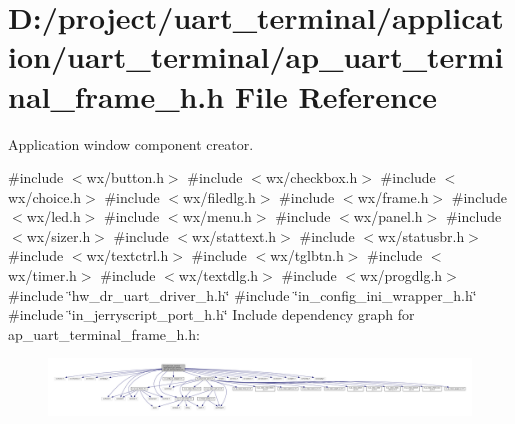 \section{D\+:/project/uart\+\_\+terminal/application/uart\+\_\+terminal/ap\+\_\+uart\+\_\+terminal\+\_\+frame\+\_\+h.h File Reference}
\label{ap__uart__terminal__frame__h_8h}


Application window component creator.  


{\ttfamily \#include $<$wx/button.\+h$>$}\newline
{\ttfamily \#include $<$wx/checkbox.\+h$>$}\newline
{\ttfamily \#include $<$wx/choice.\+h$>$}\newline
{\ttfamily \#include $<$wx/filedlg.\+h$>$}\newline
{\ttfamily \#include $<$wx/frame.\+h$>$}\newline
{\ttfamily \#include $<$wx/led.\+h$>$}\newline
{\ttfamily \#include $<$wx/menu.\+h$>$}\newline
{\ttfamily \#include $<$wx/panel.\+h$>$}\newline
{\ttfamily \#include $<$wx/sizer.\+h$>$}\newline
{\ttfamily \#include $<$wx/stattext.\+h$>$}\newline
{\ttfamily \#include $<$wx/statusbr.\+h$>$}\newline
{\ttfamily \#include $<$wx/textctrl.\+h$>$}\newline
{\ttfamily \#include $<$wx/tglbtn.\+h$>$}\newline
{\ttfamily \#include $<$wx/timer.\+h$>$}\newline
{\ttfamily \#include $<$wx/textdlg.\+h$>$}\newline
{\ttfamily \#include $<$wx/progdlg.\+h$>$}\newline
{\ttfamily \#include \char`\"{}hw\+\_\+dr\+\_\+uart\+\_\+driver\+\_\+h.\+h\char`\"{}}\newline
{\ttfamily \#include \char`\"{}in\+\_\+config\+\_\+ini\+\_\+wrapper\+\_\+h.\+h\char`\"{}}\newline
{\ttfamily \#include \char`\"{}in\+\_\+jerryscript\+\_\+port\+\_\+h.\+h\char`\"{}}\newline
Include dependency graph for ap\+\_\+uart\+\_\+terminal\+\_\+frame\+\_\+h.\+h\+:
\nopagebreak
\begin{figure}[H]
\begin{center}
\leavevmode
\includegraphics[width=350pt]{ap__uart__terminal__frame__h_8h__incl}
\end{center}
\end{figure}
